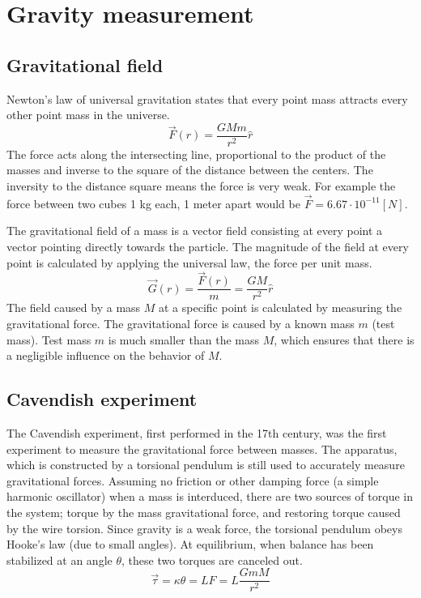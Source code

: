 \documentclass[\main/master.tex]{subfiles}
\begin{document}
\section{Gravity measurement}

\subsection{Gravitational field}
Newton's law of universal gravitation states that every point mass attracts every other point mass in the universe.
\begin{equation}
\overrightarrow{F}(r) = \frac{GMm}{r^2}\hat{r}    \label{eqn:gravitation_force}
\end{equation} 
The force acts along the intersecting line, proportional to the product of the masses and inverse to the square of the distance between the centers. The inversity to the distance square means the force is very weak. For example the force between two cubes 1 kg each, 1 meter apart would be $\overrightarrow{F} = 6.67\cdot10^{-11} [N]$.
\par\noindent
The gravitational field of a mass is a vector field consisting at every point a vector pointing directly towards the particle. The magnitude of the field at every point is calculated by applying the universal law, the force per unit mass. 
\begin{equation}
\overrightarrow{G}(r) = \frac{\overrightarrow{F}(r)}{m} = \frac{GM}{r^2}\hat{r}    \label{eqn:gravitation_field}
\end{equation}
The field caused by a mass $M$ at a specific point is calculated by measuring the gravitational force. The gravitational force is caused by a known mass $m$ (test mass). Test mass $m$ is much smaller than the mass $M$, which ensures that there is a negligible influence on the behavior of $M$.  



\subsection{Cavendish experiment}
The Cavendish experiment, first performed in the 17th century, was the first experiment to measure the gravitational force between masses. The apparatus, which is constructed by a torsional pendulum is still used to accurately measure gravitational forces. Assuming no friction or other damping force (a simple harmonic oscillator) when a mass is interduced, there are two sources of torque in the system; torque by the mass gravitational force, and restoring torque caused by the wire torsion. Since gravity is a weak force, the torsional pendulum obeys Hooke’s law (due to small angles). At equilibrium, when balance has been stabilized at an angle $\theta$, these two torques are canceled out.
\begin{equation}
\overrightarrow{\tau} = \kappa\theta = LF = L\frac{GmM}{r^2}    \label{eqn:gravitation_torque}
\end{equation}
\end{document}
